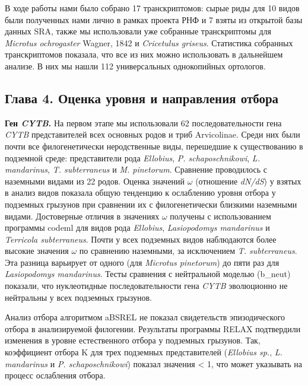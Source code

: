 В ходе работы нами было собрано 17 транскриптомов: сырые риды для 10 видов были полученных нами лично в рамках проекта РНФ и 7 взяты из открытой базы данных SRA, также мы использовали уже собранные транскриптомы для \textit{Microtus ochrogaster} Wagner, 1842 и \textit{Cricetulus griseus}. Статистика собранных транскриптомов показала, что все из них можно использовать в дальнейшем анализе. В них мы нашли 112 универсальных однокопийных ортологов. 


\subsection*{Глава 4. Оценка уровня и направления отбора}

\textbf{Ген \textit{CYTB}.} На первом этапе мы использовали 62 последовательности гена \textit{CYTB} представителей всех основных родов и триб Arvicolinae. Среди них были почти все филогенетически неродственные виды, перешедшие к существованию в подземной среде: представители рода \textit{Ellobius}, \textit{P. schaposchnikowi}, \textit{L. mandarinus}, \textit{T. subterraneus} и \textit{M. pinetorum}. Сравнение проводилось с наземными видами из 22 родов.  Оценка значений $\omega$ (отношение \textit{dN/dS}) у взятых в анализ видов показала общую тенденцию к ослаблению уровня отбора у подземных грызунов при сравнении их с филогенетически близкими наземными видами. Достоверные отличия в значениях $\omega$ получены с использованием программы codeml для видов рода \textit{Ellobius}, \textit{Lasiopodomys mandarinus} и \textit{Terricola subterraneus}. Почти у всех подземных видов наблюдаются более высокие значения $\omega$ по сравнению наземными, за исключением \textit{T. subterraneus}. Эта разница варьирует от одного (для \textit{Microtus pinetorum}) до пяти раз для \textit{Lasiopodomys mandarinus}. Тесты сравнения с нейтральной моделью (b\_neut) показали, что нуклеотидные последовательности гена \textit{CYTB} эволюционно не нейтральны у всех подземных грызунов. 

Анализ отбора алгоритмом aBSREL не показал свидетельств эпизодического отбора в анализируемой филогении. Результаты программы RELAX подтвердили изменения в уровне естественного отбора у подземных грызунов. Так, коэффициент отбора K для трех подземных представителей (\textit{Ellobius sp.}, \textit{L. mandarinus} и \textit{P. schaposchnikowi}) показал значения < 1, что может указывать на процесс ослабления отбора. 

